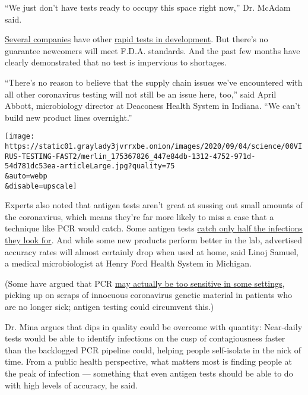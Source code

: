 ``We just don't have tests ready to occupy this space right now,'' Dr.
McAdam said.

\href{https://www.nytimes3xbfgragh.onion/2020/09/02/us/politics/covid-testing.html}{Several
companies} have other
\href{https://www.nytimes3xbfgragh.onion/2020/07/06/health/fast-coronavirus-tests.html}{rapid
tests in development}. But there's no guarantee newcomers will meet
F.D.A. standards. And the past few months have clearly demonstrated that
no test is impervious to shortages.

``There's no reason to believe that the supply chain issues we've
encountered with all other coronavirus testing will not still be an
issue here, too,'' said April Abbott, microbiology director at Deaconess
Health System in Indiana. ``We can't build new product lines
overnight.''

\texttt{[image: https://static01.graylady3jvrrxbe.onion/images/2020/09/04/science/00VIRUS-TESTING-FAST2/merlin\_175367826\_447e84db-1312-4752-971d-54d781dc53ea-articleLarge.jpg?quality=75\\\&auto=webp\\\&disable=upscale]}

Experts also noted that antigen tests aren't great at sussing out small
amounts of the coronavirus, which means they're far more likely to miss
a case that a technique like PCR would catch. Some antigen tests
\href{https://www.cdc.gov/flu/professionals/diagnosis/clinician_guidance_ridt.htm\#:~:text=References-,Background,of\%20RIDTs\%20are\%20commercially\%20available.}{catch
only half the infections they look for}. And while some new products
perform better in the lab, advertised accuracy rates will almost
certainly drop when used at home, said Linoj Samuel, a medical
microbiologist at Henry Ford Health System in Michigan.

(Some have argued that PCR
\href{https://www.nytimes3xbfgragh.onion/2020/08/29/health/coronavirus-testing.html}{may
actually be too sensitive in some settings}, picking up on scraps of
innocuous coronavirus genetic material in patients who are no longer
sick; antigen testing could circumvent this.)

Dr. Mina argues that dips in quality could be overcome with quantity:
Near-daily tests would be able to identify infections on the cusp of
contagiousness faster than the backlogged PCR pipeline could, helping
people self-isolate in the nick of time. From a public health
perspective, what matters most is finding people at the peak of
infection --- something that even antigen tests should be able to do
with high levels of accuracy, he said.


